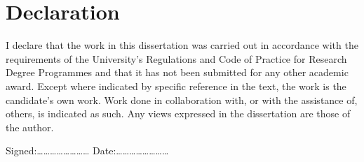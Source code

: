 \chapter*{Declaration}

I declare that the work in this dissertation was carried out in accordance with the requirements of the University's 
Regulations and Code of Practice for Research Degree Programmes and that it has not been submitted for any other academic 
award. Except where indicated by specific reference in the text, the work is the candidate's own work. Work done in 
collaboration with, or with the assistance of, others, is indicated as such. Any views expressed in the dissertation are 
those of the author.

\vspace{5cm}
\noindent
Signed:\ldots\ldots\ldots\ldots\ldots\ldots\ldots\ldots \hfill
Date:\ldots\ldots\ldots\ldots\ldots\ldots\ldots\ldots